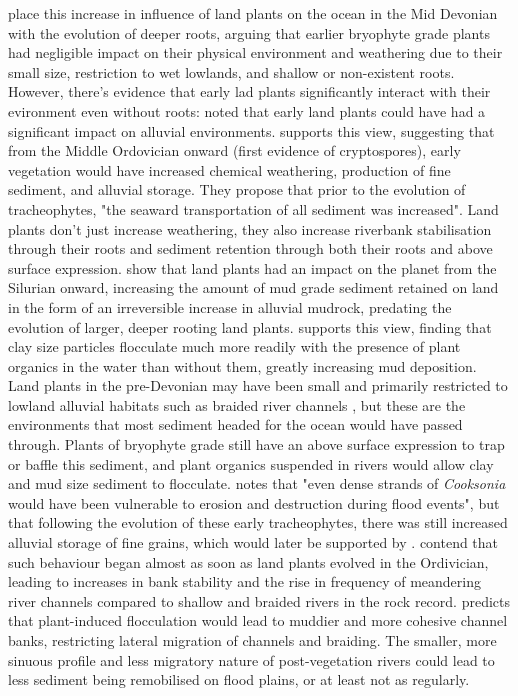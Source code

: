 \documentclass[11pt,a4paper]{article}
\begin{document}
\cite{Algeo1998} place this increase in influence of land plants on the ocean in the Mid Devonian with the evolution of deeper roots, arguing that earlier bryophyte grade plants had negligible impact on their physical environment and weathering due to their small size, restriction to wet lowlands, and shallow or non-existent roots.
 However, there's evidence that early lad plants significantly interact with their evironment even without roots:
\cite{Schumm1968} noted that early land plants could have had a significant impact on alluvial environments. 
\cite{Davies2010} supports this view, suggesting that from the Middle Ordovician onward (first evidence of cryptospores), early vegetation would have increased chemical weathering, production of fine sediment, and alluvial storage. They propose that prior to the evolution of tracheophytes, "the seaward transportation of all sediment was increased".
 Land plants don't just increase weathering, they also increase riverbank stabilisation through their roots \citep{McMahon2018b} and sediment retention through both their roots and above surface expression. 
\cite{McMahon2018a} show that land plants had an impact on the planet from the Silurian onward, increasing the amount of mud grade sediment retained on land in the form of an irreversible increase in alluvial mudrock, predating the evolution of larger, deeper rooting land plants. 
\cite{Zeichner2021} supports this view, finding that clay size particles flocculate much more readily with the presence of plant organics in the water than without them, greatly increasing mud deposition. 
Land plants in the pre-Devonian may have been small and primarily restricted to lowland alluvial habitats such as braided river channels \citep{Davies2010}, but these are the environments that most sediment headed for the ocean would have passed through. Plants of bryophyte grade still have an above surface expression to trap or baffle this sediment, and plant organics suspended in rivers would allow clay and mud size sediment to flocculate. 
\cite{Davies2010} notes that "even dense strands of \textit{Cooksonia} would have been vulnerable to erosion and destruction during flood events", but that following the evolution of these early tracheophytes, there was still increased alluvial storage of fine grains, which would later be supported by \cite{McMahon2018a}. 
  \cite{McMahon2018b} contend that such behaviour began almost as soon as land plants evolved in the Ordivician, leading to increases in bank stability and the rise in frequency of meandering river channels compared to shallow and braided rivers in the rock record. 
 \cite{Zeichner2021} predicts that plant-induced flocculation would lead to muddier and more cohesive channel banks, restricting lateral migration of channels and braiding. The smaller, more sinuous profile and less migratory nature of post-vegetation rivers could lead to less sediment being remobilised on flood plains, or at least not as regularly. %
\end{document}
